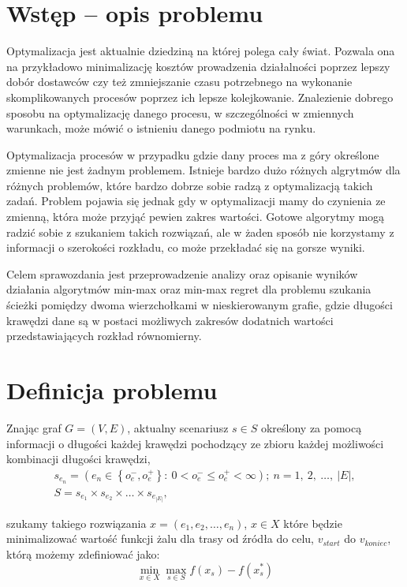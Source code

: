 \documentclass[10pt]{article}
\def\fraw{f(x_s)}
\def\fide{f(x_s^*)}
\begin{document}
\section{Wstęp -- opis problemu}
\label{sec:wstep}
Optymalizacja jest aktualnie dziedziną na której polega cały świat. Pozwala ona na przykładowo minimalizację kosztów prowadzenia działalności poprzez lepszy dobór dostawców czy też zmniejszanie czasu potrzebnego na wykonanie skomplikowanych procesów poprzez ich lepsze kolejkowanie. Znalezienie dobrego sposobu na optymalizację danego procesu, w szczególności w zmiennych warunkach, może mówić o istnieniu danego podmiotu na rynku.

Optymalizacja procesów w przypadku gdzie dany proces ma z góry określone zmienne nie jest żadnym problemem. Istnieje bardzo dużo różnych algrytmów dla różnych problemów, które bardzo dobrze sobie radzą z optymalizacją takich zadań. Problem pojawia się jednak gdy w optymalizacji mamy do czynienia ze zmienną, która może przyjąć pewien zakres wartości. Gotowe algorytmy mogą radzić sobie z szukaniem takich rozwiązań, ale w żaden sposób nie korzystamy z informacji o szerokości rozkładu, co może przekładać się na gorsze wyniki.

Celem sprawozdania jest przeprowadzenie analizy oraz opisanie wyników działania algorytmów min-max oraz min-max regret dla problemu szukania ścieżki pomiędzy dwoma wierzchołkami w nieskierowanym grafie, gdzie długości krawędzi dane są w postaci możliwych zakresów dodatnich wartości przedstawiających rozkład równomierny.

\section{Definicja problemu}
Znając graf $G = (V, E)$, aktualny scenariusz $s \in S$ określony za pomocą informacji o długości każdej krawędzi pochodzący ze zbioru każdej możliwości kombinacji długości krawędzi,
\begin{gather*}
  s_{e_n} = \left(e_n \in \left\{o^-_e, o^+_e\right\}:\ 0 < o^-_e \leq o^+_e < \infty\right);\ n = 1,\ 2,\ \dots,\ |E|, \\
  S = s_{e_1} \times s_{e_2} \times \dots \times s_{e_{\left|E\right|}},
\end{gather*}

\noindent
szukamy takiego rozwiązania $x = \left(e_1, e_2, \dots, e_n\right)$, $x \in X$ które będzie minimalizować wartość funkcji żalu dla trasy od źródła do celu, $v_{start}$ do $v_{koniec}$, którą możemy zdefiniować jako:
\begin{equation}
  \min_{x \in X}\max_{s \in S} \fraw - \fide
\end{equation}
\end{document}
